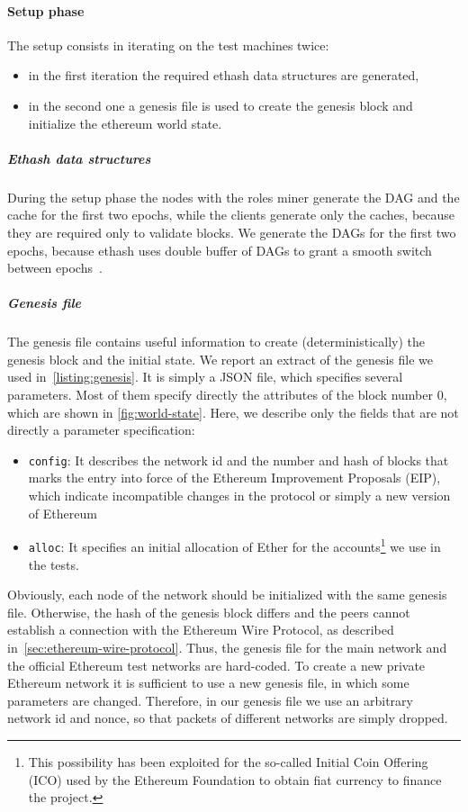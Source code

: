\paragraph{Setup phase}
The setup consists in iterating on the test machines twice:
\begin{itemize}
  \item in the first iteration the required ethash data structures are
  generated,
  \item in the second one a genesis file is used to create the genesis block
  and initialize the ethereum  world state.
\end{itemize}


\subparagraph{Ethash data structures}
During the setup phase the nodes with the roles miner generate the DAG and the
cache for the first two epochs, while the clients generate only the caches,
because they are required only to validate blocks. We generate the DAGs for the
first two epochs, because ethash uses double buffer of DAGs to grant a smooth
switch between epochs~\cite{bib:dagger-hashimoto}.

\subparagraph{Genesis file}
The genesis file contains useful information to create (deterministically) the
genesis block and the initial state. We report an extract of the genesis file
we used in~\autoref{listing:genesis}. It is simply a JSON file, which specifies
several parameters. Most of them specify directly the attributes of the block
number $0$, which are shown in \autoref{fig:world-state}. Here, we describe
only the fields that are not directly a parameter specification:
\begin{itemize}
    \item \texttt{config}: It describes the network id and the number and hash
    of blocks that marks the entry into force of the Ethereum Improvement
    Proposals (EIP), which indicate incompatible changes in the protocol or
    simply a new version of Ethereum
    \item \texttt{alloc}: It specifies an initial allocation of Ether for the
    accounts\footnote{This possibility has been exploited for the so-called
    Initial Coin Offering (ICO) used by the Ethereum Foundation to obtain fiat
    currency to finance the project.} we use in the tests.
\end{itemize}
Obviously, each node of the network should be initialized with the same genesis
file. Otherwise, the hash of the genesis block differs and the peers cannot
establish a connection with the Ethereum Wire Protocol, as described
in~\autoref{sec:ethereum-wire-protocol}. Thus, the genesis file for the main
network  and the official Ethereum test networks are hard-coded. To create a
new private Ethereum network it is sufficient to use a new genesis file, in
which some parameters are changed. Therefore, in our genesis file we use an
arbitrary network id and nonce, so that packets of different networks are
simply dropped.

